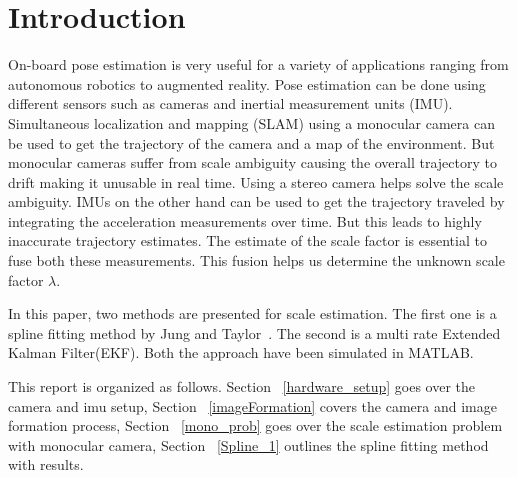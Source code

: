 \section{Introduction}
\label{introduction}

On-board pose estimation is very useful for a variety of applications ranging from autonomous robotics to augmented reality. Pose estimation can be done using different sensors such as cameras and inertial measurement units (IMU). Simultaneous localization and mapping (SLAM) using a monocular camera can be used to get the trajectory of the camera and a map of the environment. But monocular cameras suffer from scale ambiguity causing the overall trajectory to drift making it unusable in real time. Using a stereo camera helps solve the scale ambiguity. IMUs on the other hand can be used to get the trajectory traveled by integrating the acceleration measurements over time. But this leads to highly inaccurate trajectory estimates. The estimate of the scale factor is essential to fuse both these measurements. This fusion helps us determine the unknown scale factor $\lambda$.    

In this paper, two methods are presented for scale estimation. The first one is a spline fitting method by Jung and Taylor~\cite{jung2001camera}. The second is a multi rate Extended Kalman Filter(EKF). Both the approach have been simulated in MATLAB. 

This report is organized as follows. Section ~\ref{hardware_setup} goes over the camera and imu setup, Section ~\ref{imageFormation} covers the camera and image formation process, Section ~\ref{mono_prob} goes over the scale estimation problem with monocular camera, Section ~\ref{Spline_1} outlines the spline fitting method with results.